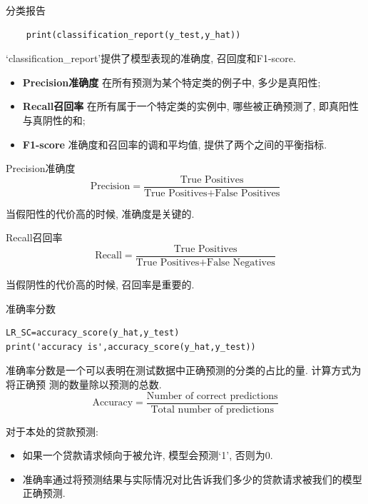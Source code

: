 \documentclass{beamer}
\begin{document}
\begin{frame}[fragile]{分类报告}
	\begin{verbatim}
	print(classification_report(y_test,y_hat))
	\end{verbatim}
	`classification\_report'提供了模型表现的准确度, 召回度和F1-score.
	\begin{itemize}
		\item \textbf{Precision准确度}
		      在所有预测为某个特定类的例子中, 多少是真阳性;

		\item \textbf{Recall召回率}
		      在所有属于一个特定类的实例中, 哪些被正确预测了, 即真阳性与真阴性的和;

		\item \textbf{F1-score}
		      准确度和召回率的调和平均值, 提供了两个之间的平衡指标.

	\end{itemize}
\end{frame}

\begin{frame}[fragile]{Precision准确度}
	\begin{equation}
		\text{Precision}=\frac{\text{True Positives}}{\text{True Positives}+\text{False Positives}}
	\end{equation}

	当假阳性的代价高的时候, 准确度是关键的.
\end{frame}

\begin{frame}[fragile]{Recall召回率}
	\begin{equation}
		\text{Recall}=\frac{\text{True Positives}}{\text{True Positives}+\text{False Negatives}}
	\end{equation}

	当假阴性的代价高的时候, 召回率是重要的.
\end{frame}

\begin{frame}[fragile]{准确率分数}
	\begin{verbatim}
LR_SC=accuracy_score(y_hat,y_test)
print('accuracy is',accuracy_score(y_hat,y_test))
	\end{verbatim}

	准确率分数是一个可以表明在测试数据中正确预测的分类的占比的量. 计算方式为将正确预
	测的数量除以预测的总数.
	\begin{equation}
		\text{Accuracy}=\frac{\text{Number of correct predictions}}{\text{Total number of predictions}}
	\end{equation}

	对于本处的贷款预测:
	\begin{itemize}
		\item 如果一个贷款请求倾向于被允许, 模型会预测`1', 否则为0.
		\item 准确率通过将预测结果与实际情况对比告诉我们多少的贷款请求被我们的模型正确预测.
	\end{itemize}

\end{frame}
\end{document}
